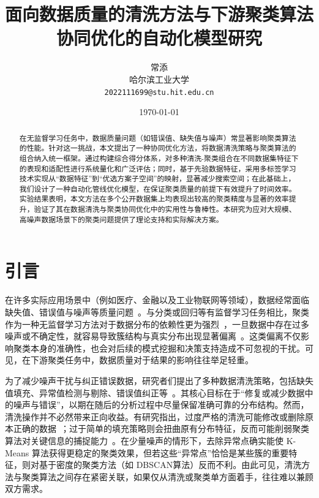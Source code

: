 \documentclass[10pt]{article} %
\numberwithin{equation}{section}
\begin{document}
\title{\textbf{面向数据质量的清洗方法与下游聚类算法协同优化的自动化模型研究}}
\author{常添 \\哈尔滨工业大学 \\ \texttt{2022111699@stu.hit.edu.cn}}
\date{\today}
\maketitle
\begin{abstract}
\normalsize
在无监督学习任务中，数据质量问题（如错误值、缺失值与噪声）常显著影响聚类算法的性能。针对这一挑战，本文提出了一种协同优化方法，将数据清洗策略与聚类算法的组合纳入统一框架。通过构建综合得分体系，对多种清洗-聚类组合在不同数据集特征下的表现和适配性进行系统量化和广泛评估；同时，基于先验数据特征，采用多标签学习技术实现从“数据特征”到“优选方案子空间”的映射，显著减少搜索空间；在此基础上，我们设计了一种自动化管线优化模型，在保证聚类质量的前提下有效提升了时间效率。实验结果表明，本文方法在多个公开数据集上均表现出较高的聚类精度与显著的效率提升，验证了其在数据清洗与聚类协同优化中的实用性与鲁棒性。本研究为应对大规模、高噪声数据场景下的聚类问题提供了理论支持和实际解决方案。
\end{abstract}

\section{引言}

在许多实际应用场景中（例如医疗、金融以及工业物联网等领域），数据经常面临缺失值、错误值与噪声等质量问题~\cite{ref1, ref2}。与分类或回归等有监督学习任务相比，聚类作为一种无监督学习方法对于数据分布的依赖性更为强烈~\cite{ref3}，一旦数据中存在过多噪声或不确定性，就容易导致簇结构与真实分布出现显著偏离~\cite{ref4}。这类偏离不仅影响聚类本身的准确性，也会对后续的模式挖掘和决策支持造成不可忽视的干扰。可见，在下游聚类任务中，数据质量对于结果的影响往往举足轻重。

为了减少噪声干扰与纠正错误数据，研究者们提出了多种数据清洗策略，包括缺失值填充、异常值检测与剔除、错误值纠正等~\cite{ref5}。其核心目标在于“修复或减少数据中的噪声与错误”，以期在随后的分析过程中尽量保留准确可靠的分布结构。然而，清洗操作并不必然带来正向收益。有研究指出，过度严格的清洗可能修改或删除原本正确的数据~\cite{ref6}；过于简单的填充策略则会扭曲原有分布特征，反而可能削弱聚类算法对关键信息的捕捉能力~\cite{ref7}。在少量噪声的情形下，去除异常点确实能使 K-Means 算法获得更稳定的聚类效果，但若这些“异常点”恰恰是某些簇的重要特征，则对基于密度的聚类方法（如 DBSCAN算法）反而不利。由此可见，清洗方法与聚类算法之间存在紧密关联，如果仅从清洗或聚类单方面着手，往往难以兼顾双方需求。
\end{document}
